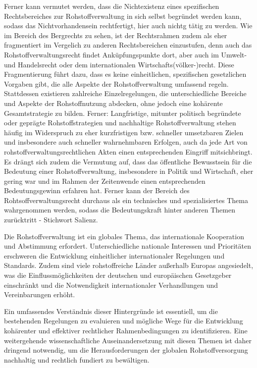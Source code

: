 \documentclass[12pt,a4paper,oneside]{book} %
\begin{document}
Ferner kann vermutet werden, dass die Nichtexistenz eines spezifischen Rechtsbereiches zur Rohstoffverwaltung in sich selbst begründet werden kann, sodass das Nichtvorhandensein rechtfertigt, hier auch nichtg tätig zu werden. Wie im Bereich des Bergrechts zu sehen, ist der Rechtsrahmen zudem als eher fragmentiert im Vergelich zu anderen Rechtsbereichen einzustufen, denn auch das Rohstoffverwaltungsrecht findet Anküpfungspunkte dort, aber auch im Umwelt- und Handelsrecht oder dem internationalen Wirtschafts(völker-)recht. Diese Fragmentierung führt dazu, dass es keine einheitlichen, spezifischen gesetzlichen Vorgaben gibt, die alle Aspekte der Rohstoffverwaltung umfassend regeln. Stattdessen existieren zahlreiche Einzelregelungen, die unterschiedliche Bereiche und Aspekte der Rohstoffnutzung abdecken, ohne jedoch eine kohärente Gesamtstrategie zu bilden.
Ferner: Langfristige, mitunter politisch begründete oder geprägte Rohstoffstrategien und nachhaltige Rohstoffverwaltung stehen häufig im Widerspruch zu eher kurzfristigen bzw. schneller umsetzbaren Zielen und insbesondere auch schneller wahrnehmbaren Erfolgen, auch da jede Art von rohstoffverwaltungsrechtlichen Akten einen entsprechenden Eingriff mitsichbringt. 
Es drängt sich zudem die Vermutung auf, dass das öffentliche Bewusstsein für die Bedeutung einer Rohstoffverwaltung, insbesondere in Politik und Wirtschaft, eher gering war und im Rahmen der Zeitenwende einen entsprechenden Bedeutungsgewinn erfahren hat. Ferner kann der Bereich des Rohtsoffverwaltungsrecht durchaus als ein technisches und spezialisiertes Thema wahrgenommen werden, sodass die Bedeutungskraft hinter anderen Themen zurücktritt - Stichwort Salienz.

Die Rohstoffverwaltung ist ein globales Thema, das internationale Kooperation und Abstimmung erfordert. Unterschiedliche nationale Interessen und Prioritäten erschweren die Entwicklung einheitlicher internationaler Regelungen und Standards. Zudem sind viele rohstoffreiche Länder außerhalb Europas angesiedelt, was die Einflussmöglichkeiten der deutschen und europäischen Gesetzgeber einschränkt und die Notwendigkeit internationaler Verhandlungen und Vereinbarungen erhöht.

Ein umfassendes Verständnis dieser Hintergründe ist essentiell, um die bestehenden Regelungen zu evaluieren und mögliche Wege für die Entwicklung kohärenter und effektiver rechtlicher Rahmenbedingungen zu identifizieren. Eine weitergehende wissenschaftliche Auseinandersetzung mit diesen Themen ist daher dringend notwendig, um die Herausforderungen der globalen Rohstoffversorgung nachhaltig und rechtlich fundiert zu bewältigen.
\end{document}
